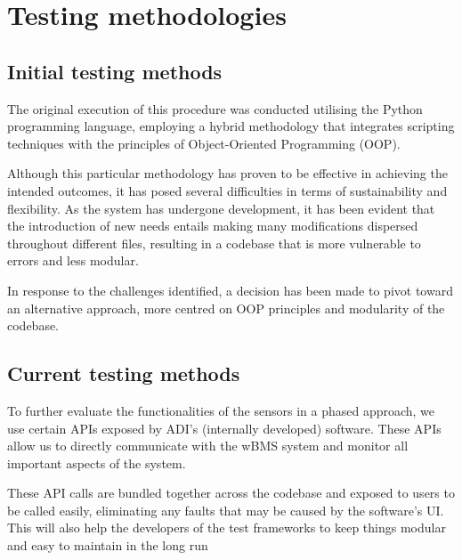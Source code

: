 
\chapter{Testing methodologies} %

\label{ch:methodologies}


\section{Initial testing methods}

The original execution of this procedure was conducted utilising the Python programming language, employing a hybrid methodology that integrates scripting techniques with the principles of Object-Oriented Programming (OOP).

Although this particular methodology has proven to be effective in achieving the intended outcomes, it has posed several difficulties in terms of sustainability and flexibility. As the system has undergone development, it has been evident that the introduction of new needs entails making many modifications dispersed throughout different files, resulting in a codebase that is more vulnerable to errors and less modular.

In response to the challenges identified, a decision has been made to pivot toward an alternative approach, more centred on OOP principles and modularity of the codebase.

\clearpage

\section{Current testing methods}

To further evaluate the functionalities of the sensors in a phased approach, we use certain APIs exposed by ADI's (internally developed) software. These APIs allow us to directly communicate with the wBMS system and monitor all important aspects of the system.

These API calls are bundled together across the codebase and exposed to users to be called easily, eliminating any faults that may be caused by the software's UI. This will also help the developers of the test frameworks to keep things modular and easy to maintain in the long run